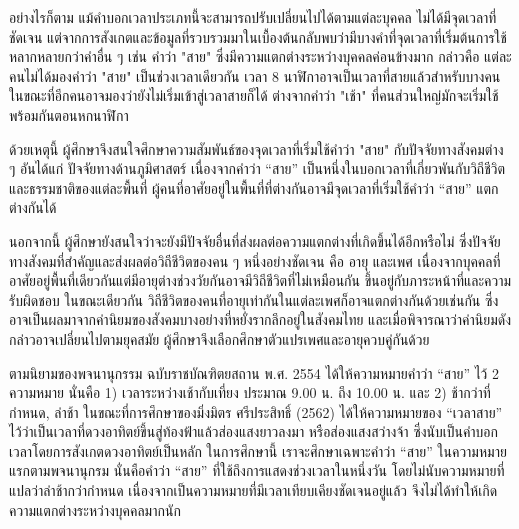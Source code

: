 \documentclass[a4paper]{article}
\begin{document}
    อย่างไรก็ตาม แม้คำบอกเวลาประเภทนี้จะสามารถปรับเปลี่ยนไปได้ตามแต่ละบุคคล ไม่ได้มีจุดเวลาที่ชัดเจน แต่จากการสังเกตและข้อมูลที่รวบรวมมาในเบื้องต้นกลับพบว่ามีบางคำที่จุดเวลาที่เริ่มต้นการใช้หลากหลายกว่าคำอื่น ๆ เช่น คำว่า "สาย" ซึ่งมีความแตกต่างระหว่างบุคคลค่อนข้างมาก กล่าวคือ แต่ละคนไม่ได้มองคำว่า "สาย" เป็นช่วงเวลาเดียวกัน เวลา 8 นาฬิกาอาจเป็นเวลาที่สายแล้วสำหรับบางคน ในขณะที่อีกคนอาจมองว่ายังไม่เริ่มเข้าสู่เวลาสายก็ได้ ต่างจากคำว่า "เช้า" ที่คนส่วนใหญ่มักจะเริ่มใช้พร้อมกันตอนหกนาฬิกา

    ด้วยเหตุนี้ ผู้ศึกษาจึงสนใจศึกษาความสัมพันธ์ของจุดเวลาที่เริ่มใช้คำว่า "สาย" กับปัจจัยทางสังคมต่าง ๆ อันได้แก่ ปัจจัยทางด้านภูมิศาสตร์ เนื่องจากคำว่า “สาย” เป็นหนึ่งในบอกเวลาที่เกี่ยวพันกับวิถีชีวิตและธรรมชาติของแต่ละพื้นที่ ผู้คนที่อาศัยอยู่ในพื้นที่ที่ต่างกันอาจมีจุดเวลาที่เริ่มใช้คำว่า “สาย” แตกต่างกันได้

    นอกจากนี้ ผู้ศึกษายังสนใจว่าจะยังมีปัจจัยอื่นที่ส่งผลต่อความแตกต่างที่เกิดขึ้นได้อีกหรือไม่ ซึ่งปัจจัยทางสังคมที่สำคัญและส่งผลต่อวิถีชีวิตของคน ๆ หนึ่งอย่างชัดเจน คือ อายุ และเพศ เนื่องจากบุคคลที่อาศัยอยู่พื้นที่เดียวกันแต่มีอายุต่างช่วงวัยกันอาจมีวิถีชีวิตที่ไม่เหมือนกัน ขึ้นอยู่กับภาระหน้าที่และความรับผิดชอบ ในขณะเดียวกัน วิถีชีวิตของคนที่อายุเท่ากันในแต่ละเพศก็อาจแตกต่างกันด้วยเช่นกัน ซึ่งอาจเป็นผลมาจากค่านิยมของสังคมบางอย่างที่หยั่งรากลึกอยู่ในสังคมไทย และเมื่อพิจารณาว่าค่านิยมดังกล่าวอาจเปลี่ยนไปตามยุคสมัย ผู้ศึกษาจึงเลือกศึกษาตัวแปรเพศและอายุควบคู่กันด้วย

    ตามนิยามของพจนานุกรรม ฉบับราชบัณฑิตยสถาน พ.ศ. 2554 ได้ให้ความหมายคำว่า “สาย” ไว้ 2 ความหมาย นั่นคือ 1) เวลาระหว่างเช้ากับเที่ยง ประมาณ 9.00 น. ถึง 10.00 น. และ 2) ช้ากว่าที่กำหนด, ล่าช้า ในขณะที่การศึกษาของมิ่งมิตร ศรีประสิทธิ์ (2562) ได้ให้ความหมายของ “เวลาสาย” ไว้ว่าเป็นเวลาที่ดวงอาทิตย์ขึ้นสู่ท้องฟ้าแล้วส่องแสงยาวลงมา หรือส่องแสงสว่างจ้า ซึ่งนับเป็นคำบอกเวลาโดยการสังเกตดวงอาทิตย์เป็นหลัก ในการศึกษานี้ เราจะศึกษาเฉพาะคำว่า “สาย” ในความหมายแรกตามพจนานุกรม นั่นคือคำว่า “สาย” ที่ใช้ถึงการแสดงช่วงเวลาในหนึ่งวัน โดยไม่นับความหมายที่แปลว่าล่าช้ากว่ากำหนด เนื่องจากเป็นความหมายที่มีเวลาเทียบเคียงชัดเจนอยู่แล้ว จึงไม่ได้ทำให้เกิดความแตกต่างระหว่างบุคคลมากนัก
\end{document}
